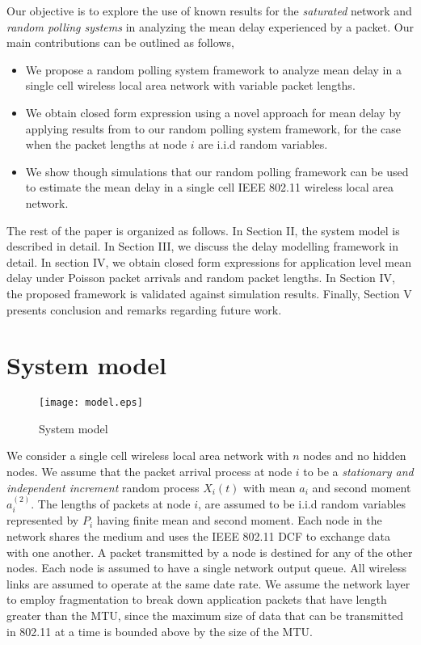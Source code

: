 \documentclass[10pt, conference, compsocconf]{IEEEtran}
\begin{document}
Our objective is to explore the use of known results for the \emph{saturated} network and \emph{random polling systems} in analyzing the mean delay experienced by a packet. Our main contributions can be outlined as follows,
\begin{itemize}
\item We propose a random polling system framework to analyze mean delay in a single cell wireless local area network with variable packet lengths.
\item We obtain closed form expression using a novel approach for mean delay by applying results from \cite{lee} to our random polling system framework, for the case when the packet lengths at node $i$ are i.i.d random variables.
\item We show though simulations that our random polling framework can be used to estimate the mean delay in a single cell IEEE 802.11 wireless local area network.
\end{itemize}

The rest of the paper is organized as follows. In Section II, the system model is described in detail. In Section III, we discuss the delay modelling framework in detail. In section IV,  we obtain closed form expressions for application level mean delay under Poisson packet arrivals and random packet lengths. In Section IV, the proposed framework is validated against simulation results. Finally, Section V presents conclusion and remarks regarding future work.

\section{\large{System model}}
\label{model}
\begin{figure}[h]
\centering
\texttt{[image: model.eps]}
\caption {System model}
\label{fig:model}
\end{figure}

We consider a single cell wireless local area network with $n$ nodes and no hidden nodes. We assume that the packet arrival process at node $i$ to be a \emph{stationary and independent increment} random process $X_i(t)$ with mean $a_i$ and second moment $a^{(2)}_i$. The lengths of packets at node $i$, are assumed to be i.i.d random variables represented by $P_i$ having finite mean and second moment. Each node in the network shares the medium and uses the IEEE 802.11 DCF to exchange data with one another. A packet transmitted by a node is destined for any of the other nodes. Each node is assumed to have a single network output queue. All wireless links are assumed to operate at the same date rate.
We assume the network layer to employ fragmentation to break down application packets that have length greater than the MTU, since the maximum size of data that can be transmitted in 802.11 at a time is bounded above by the size of the MTU.
\end{document}
